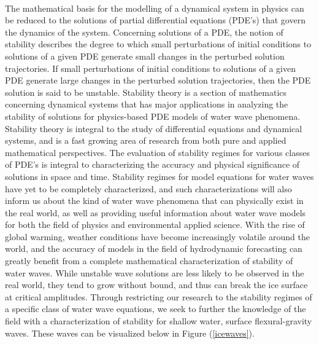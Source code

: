 \documentclass{article}
\begin{document}
\\
The mathematical basis for the modelling of a dynamical system in physics can be reduced to the solutions of partial differential equations (PDE’s) that govern the dynamics of the system. Concerning solutions of a PDE, the notion of stability describes the degree to which small perturbations of initial conditions to solutions of a given PDE generate small changes in the perturbed solution trajectories. If small perturbations of initial conditions to solutions of a given PDE generate large changes in the perturbed solution trajectories, then the PDE solution is said to be unstable. Stability theory is a section of mathematics concerning dynamical systems that has major applications in analyzing the stability of solutions for physics-based PDE models of water wave phenomena. \\

Stability theory is integral to the study of differential equations and dynamical systems, and is a fast growing area of research from both pure and applied mathematical perspectives. The evaluation of stability regimes for various classes of PDE’s is integral to characterizing the accuracy and physical significance of solutions in space and time. Stability regimes for model equations for water waves have yet to be completely characterized, and such characterizations will also inform us about the kind of water wave phenomena that can physically exist in the real world, as well as providing useful information about water wave models for both the field of physics and environmental applied science. With the rise of global warming, weather conditions have become increasingly volatile around the world, and the accuracy of models in the field of hydrodynamic forecasting can greatly benefit from a complete mathematical characterization of stability of water waves. While unstable wave solutions are less likely to be observed in the real world, they tend to grow without bound, and thus can break the ice surface at critical amplitudes. Through restricting our research to the stability regimes of a specific class of water wave equations, we seek to further the knowledge of the field with a characterization of stability for shallow water, surface flexural-gravity waves. These waves can be visualized below in Figure (\ref{icewaves}). \\
\end{document}
